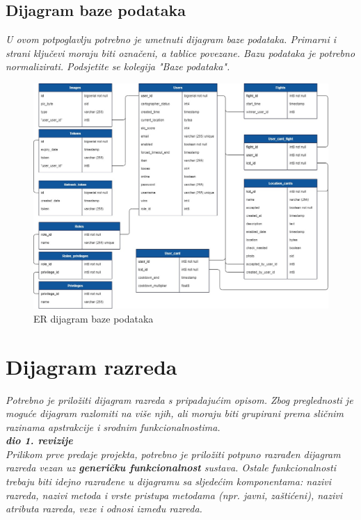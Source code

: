 			\subsection{Dijagram baze podataka}
				\textit{ U ovom potpoglavlju potrebno je umetnuti dijagram baze podataka. Primarni i strani ključevi moraju biti označeni, a tablice povezane. Bazu podataka je potrebno normalizirati. Podsjetite se kolegija "Baze podataka".}
				
				\begin{figure}[H]
					\centering
					\includegraphics[scale=0.4]{slike/ERModel} 
					\caption{ER dijagram baze podataka}
					\label{fig:ER}
				\end{figure}
			
			\eject
			
			
		\section{Dijagram razreda}
		
			\textit{Potrebno je priložiti dijagram razreda s pripadajućim opisom. Zbog preglednosti je moguće dijagram razlomiti na više njih, ali moraju biti grupirani prema sličnim razinama apstrakcije i srodnim funkcionalnostima.}\\
			
			\textbf{\textit{dio 1. revizije}}\\
			
			\textit{Prilikom prve predaje projekta, potrebno je priložiti potpuno razrađen dijagram razreda vezan uz \textbf{generičku funkcionalnost} sustava. Ostale funkcionalnosti trebaju biti idejno razrađene u dijagramu sa sljedećim komponentama: nazivi razreda, nazivi metoda i vrste pristupa metodama (npr. javni, zaštićeni), nazivi atributa razreda, veze i odnosi između razreda.}\\
			
